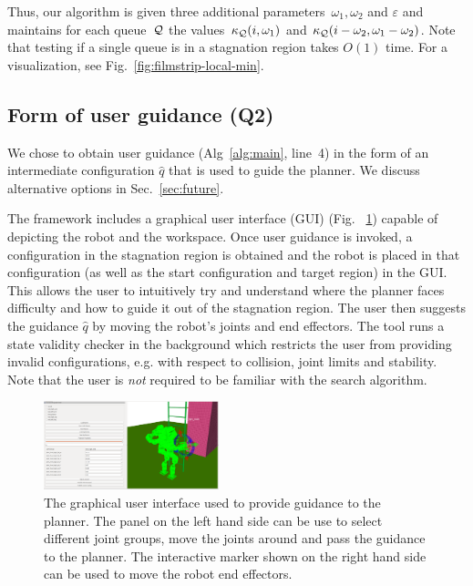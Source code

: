 \documentclass{article}
\begin{document}

Thus, our algorithm is given three additional parameters~$\omega_1, \omega_2$ and $\varepsilon$ 
and maintains  for each queue~$\mathcal{Q}$ the values~$\kappa_{\mathcal{Q}}(i, \omega_1)$ and $\kappa_{\mathcal{Q}}(i - \omega_2, \omega_1 - \omega_2)$.
Note that testing if a single queue is in a stagnation region takes $O(1)$ time.
For a visualization, see Fig.~\ref{fig:filmstrip-local-min}.


\subsection{Form of user guidance (Q2)}
\label{sec:q2}
We chose to obtain user guidance 
(Alg~\ref{alg:main}, line~4)
in the form of an intermediate configuration $\hat{q}$ that is used to guide the planner. We discuss alternative options in Sec.~\ref{sec:future}.

The framework includes a graphical user interface (GUI) (Fig.
~\ref{fig:gui}) capable of  depicting the robot and the workspace.
Once user guidance is invoked, 
a configuration in the stagnation region is obtained and the robot is placed in that configuration (as well as the start configuration and target region) in the GUI.
This allows the user to intuitively try and understand where the planner faces difficulty and how to guide it out of the stagnation region.
The user then suggests the guidance $\hat{q}$ by moving the robot's joints and end effectors.
The tool runs a state validity checker in the background which restricts the user from providing invalid configurations, e.g. with respect to collision, joint limits and stability.
Note that the user is \emph{not} required to be familiar with the search algorithm.

\begin{figure}[tb]
  \centering
  	\includegraphics[width=0.453\textwidth]{fig/gui.png}
  \caption{
		The graphical user interface used to provide guidance to the planner. The panel on the left hand side can be use to select different joint groups, move the joints around and pass the guidance to the planner. The interactive marker shown on the right hand side can be used to move the robot end effectors.
  	\vspace{-5mm}
}
   	\label{fig:gui}
\end{figure}
\end{document}
